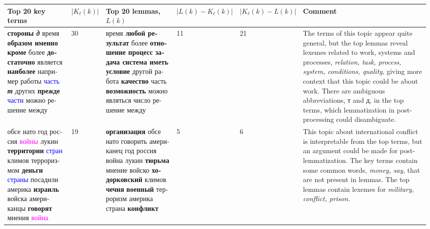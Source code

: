\documentclass[11pt,a4paper]{article}
\begin{document}
\begin{landscape}
\begin{table*}[h!]
    \begin{tabularx}{\textwidth}{|X|l|X|l|l|X|} \hline
    Top 20 key terms & $|K_\ell(k)|$ & Top 20 lemmas, $L(k)$ &$|L(k) - K_\ell(k)|$ & $|K_\ell(k) - L(k)|$ &  Comment \\ \hline
    \foreignlanguage{russian}{\textbf{стороны \textit{д}} время \textbf{образом именно кроме} более \textbf{достаточно} является \textbf{наиболее} например работы \textcolor{blue}{часть} \textbf{\textit{т}} других \textbf{прежде} \textcolor{blue}{части} можно решение между
    } & 30 & \foreignlanguage{russian}{время \textbf{любой результат} более \textbf{отношение процесс задача система иметь условие} другой работа \textbf{качество} часть \textbf{возможность} можно являться число решение между} & 11 & 21 & The terms of this topic appear quite general, but the top lemmas reveal lexemes related to work, systems and processes, \textit{relation, task, process, system, conditions, quality}, giving more context that this topic could be about work. There are ambiguous abbreviations, \foreignlanguage{russian}{т} and \foreignlanguage{russian}{д}, in the top terms, which lemmatization in post-processing could disambiguate. \\ \hline
    \foreignlanguage{russian}{обсе нато год россия \textcolor{magenta}{войны} лукин \textbf{территории} \textcolor{blue}{стран} климов терроризмом \textbf{деньги} \textcolor{blue}{страны} посадили америка \textbf{израиль} войска американцы \textbf{говорят} мнения \textcolor{magenta}{война}} & 19 & \foreignlanguage{russian}{\textbf{организация} обсе нато говорить американец год россия война лукин \textbf{тюрьма} мнение войско \textbf{ходорковский} климов \textbf{чечня} \textbf{военный} терроризм америка страна \textbf{конфликт}} & 5 & 6 & This topic about international conflict is interpretable from the top terms, but an argument could be made for post-lemmatization. The key terms contain some common words, \textit{money, say}, that are not present in lemmas. The top lemmas contain lexemes for \textit{military, conflict, prison}. \\ \hline

\end{tabularx}
\end{table*}
\end{landscape}
\end{document}
